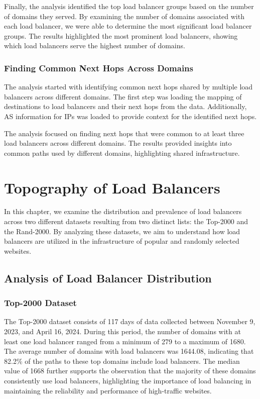 \documentclass[12pt]{cwru_thesis}
\begin{document}
Finally, the analysis identified the top load balancer groups based on the number of domains they served. By examining the number of domains associated with each load balancer, we were able to determine the most significant load balancer groups. The results highlighted the most prominent load balancers, showing which load balancers serve the highest number of domains.

\subsection{Finding Common Next Hops Across Domains}

The analysis started with identifying common next hops shared by multiple load balancers across different domains. The first step was loading the mapping of destinations to load balancers and their next hops from the data. Additionally, AS information for IPs was loaded to provide context for the identified next hops. 

The analysis focused on finding next hops that were common to at least three load balancers across different domains. The results provided insights into common paths used by different domains, highlighting shared infrastructure.

\chapter{Topography of Load Balancers}

In this chapter, we examine the distribution and prevalence of load balancers across two different datasets resulting from two distinct lists: the Top-2000 and the Rand-2000. By analyzing these datasets, we aim to understand how load balancers are utilized in the infrastructure of popular and randomly selected websites.

\section{Analysis of Load Balancer Distribution}

\subsection{Top-2000 Dataset}

The Top-2000 dataset consists of 117 days of data collected between November 9, 2023, and April 16, 2024. During this period, the number of domains with at least one load balancer ranged from a minimum of 279 to a maximum of 1680. The average number of domains with load balancers was 1644.08, indicating that 82.2\% of the paths to these top domains include load balancers. The median value of 1668 further supports the observation that the majority of these domains consistently use load balancers, highlighting the importance of load balancing in maintaining the reliability and performance of high-traffic websites.
\end{document}
